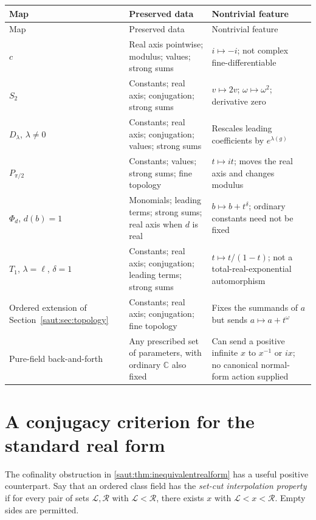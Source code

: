 \documentclass[11pt]{article}
\theoremstyle{definition}
\theoremstyle{remark}
\newcommand{\C}{\mathbb C}
\numberwithin{equation}{section}
\begin{document}
\small
\begin{longtable}{@{}>{\RaggedRight\arraybackslash}p{}>{\RaggedRight\arraybackslash}p{}>{\RaggedRight\arraybackslash}p{}@{}}
\toprule
Map & Preserved data & Nontrivial feature\\
\midrule
\endfirsthead
\toprule
Map & Preserved data & Nontrivial feature\\
\midrule
\endhead
$c$ & Real axis pointwise; modulus; values; strong sums & $i\mapsto-i$;
not complex fine-differentiable\\[5pt]
$S_2$ & Constants; real axis; conjugation; strong sums & $v\mapsto2v$;
$\omega\mapsto\omega^2$; derivative zero\\[5pt]
$D_\lambda$, $\lambda\ne0$ & Constants; real axis; conjugation; values;
strong sums & Rescales leading coefficients by $e^{\lambda(g)}$\\[5pt]
$P_{\pi/2}$ & Constants; values; strong sums; fine topology & $t\mapsto it$;
moves the real axis and changes modulus\\[5pt]
$\Phi_d$, $d(b)=1$ & Monomials; leading terms; strong sums; real axis when
$d$ is real & $b\mapsto b+t^\delta$; ordinary constants need not be fixed\\[5pt]
$T_1$, $\lambda=\ell$, $\delta=1$ & Constants; real axis; conjugation;
leading terms; strong sums & $t\mapsto t/(1-t)$; not a total-real-exponential
automorphism\\[5pt]
Ordered extension of Section~\ref{saut:sec:topology} & Constants; real axis;
conjugation; fine topology & Fixes the summands of $a$ but sends
$a\mapsto a+t^\omega$\\[5pt]
Pure-field back-and-forth & Any prescribed set of parameters, with ordinary
$\C$ also fixed & Can send a positive infinite $x$ to $x^{-1}$ or $ix$;
no canonical normal-form action supplied\\
\bottomrule
\end{longtable}
\normalsize

\section{A conjugacy criterion for the standard real form}\label{saut:app:conjugacy}

The cofinality obstruction in \cref{saut:thm:inequivalentrealform} has a useful
positive counterpart. Say that an ordered class field has the
\emph{set-cut interpolation property} if for every pair of sets
$\mathcal L,\mathcal R$ with $\mathcal L<\mathcal R$, there exists $x$ with
$\mathcal L<x<\mathcal R$. Empty sides are permitted.
\end{document}
